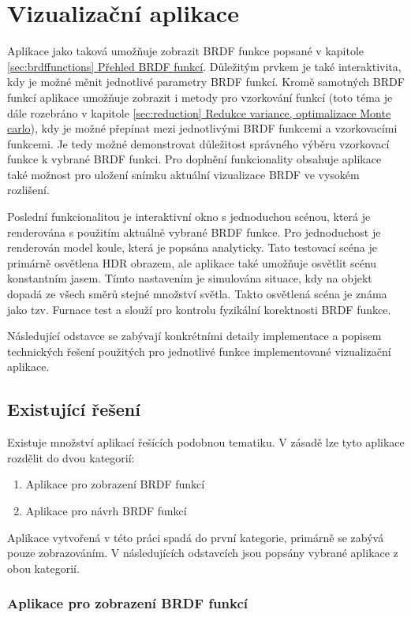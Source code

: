 \documentclass[czech,master]{diploma}
\begin{document}
\chapter{Vizualizační aplikace}
Aplikace jako taková umožňuje zobrazit BRDF funkce popsané v kapitole \hyperref[sec:brdffunctions]{\ref{sec:brdffunctions} Přehled BRDF funkcí}. Důležitým prvkem je také interaktivita, kdy je možné měnit jednotlivé parametry BRDF funkcí. Kromě samotných BRDF funkcí aplikace umožňuje zobrazit i metody pro vzorkování funkcí (toto téma je dále rozebráno v kapitole \hyperref[sec:reduction]{\ref{sec:reduction} Redukce variance, optimalizace Monte carlo}), kdy je možné přepínat mezi jednotlivými BRDF funkcemi a vzorkovacími funkcemi. Je tedy možné demonstrovat důležitost správného výběru vzorkovací funkce k vybrané BRDF funkci. Pro doplnění funkcionality obsahuje aplikace také možnost pro uložení snímku aktuální vizualizace BRDF ve vysokém rozlišení. \par
Poslední funkcionalitou je interaktivní okno s jednoduchou scénou, která je renderována s použitím aktuálně vybrané BRDF funkce. Pro jednoduchost je renderován model koule, která je popsána analyticky. Tato testovací scéna je primárně osvětlena HDR obrazem, ale aplikace také umožňuje osvětlit scénu konstantním jasem. Tímto nastavením je simulována situace, kdy na objekt dopadá ze všech směrů stejné množství světla. Takto osvětlená scéna je známa jako tzv. Furnace test a slouží pro kontrolu fyzikální korektnosti BRDF funkce.\par
Následující odstavce se zabývají konkrétními detaily implementace a popisem technických řešení použitých pro jednotlivé funkce implementované vizualizační aplikace.

\section{Existující řešení}
Existuje množství aplikací řešících podobnou tematiku. V zásadě lze tyto aplikace rozdělit do dvou kategorií:
\begin{enumerate}
  \item Aplikace pro zobrazení BRDF funkcí
  \item Aplikace pro návrh BRDF funkcí
\end{enumerate}
Aplikace vytvořená v této práci spadá do první kategorie, primárně se zabývá pouze zobrazováním. V následujících odstavcích jsou popsány vybrané aplikace z obou kategorií.
\subsection{Aplikace pro zobrazení BRDF funkcí}
\end{document}
